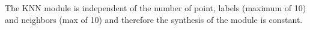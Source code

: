 The KNN module is independent of the number of point, labels (maximum of 10) and neighbors (max of 10) and therefore the synthesis of the module is constant.
